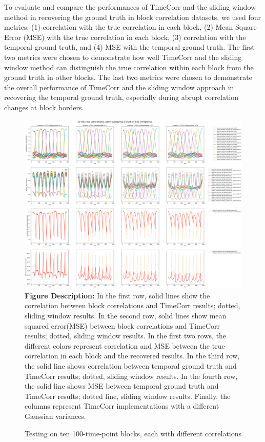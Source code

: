 \documentclass[11pt]{article}
\begin{document}
To evaluate and compare the performances of TimeCorr and the sliding window method in recovering the ground truth in block correlation datasets, we used four metrics: (1) correlation with the true correlation in each block, (2) Mean Square Error (MSE) with the true correlation in each block, (3) correlation with the temporal ground truth, and (4) MSE with the temporal ground truth. The first two metrics were chosen to demonstrate how well TimeCorr and the sliding window method can distinguish the true correlation within each block from the ground truth in other blocks. The last two metrics were chosen to demonstrate the overall performance of TimeCorr and the sliding window approach in recovering the temporal ground truth, especially during abrupt correlation changes at block borders.

\begin{figure}[!htb]
\caption{Testing on ten 100-time-point blocks, each with different correlations}
\includegraphics[width=1\textwidth]{../figures/SyntheticTesting/10block100t.png}
\label{fig:10block100t}
\small{\textbf{Figure Description:} In the first row, solid lines show the correlation between block correlations and TimeCorr results; dotted, sliding window results. In the second row, solid lines show mean squared error(MSE) between block correlations and TimeCorr results; dotted, sliding window results. In the first two rows, the different colors represent correlation and MSE between the true correlation in each block and the recovered results. In the third row, the solid line shows correlation between temporal ground truth and TimeCorr results; dotted, sliding window results. In the fourth row, the solid line shows MSE between temporal ground truth and TimeCorr results; dotted line, sliding window results. Finally, the columns represent TimeCorr implementations with a different Gaussian variances.}
\end{figure}
\end{document}
